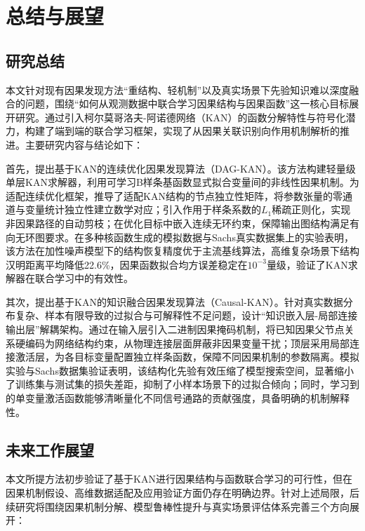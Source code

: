 \chapter{总结与展望}
\label{chap:conclusion}

\section{研究总结}
\label{sec:summary}

本文针对现有因果发现方法“重结构、轻机制”以及真实场景下先验知识难以深度融合的问题，围绕“如何从观测数据中联合学习因果结构与因果函数”这一核心目标展开研究。通过引入柯尔莫哥洛夫-阿诺德网络（KAN）的函数分解特性与符号化潜力，构建了端到端的联合学习框架，实现了从因果关联识别向作用机制解析的推进。主要研究内容与结论如下：

首先，提出基于KAN的连续优化因果发现算法（DAG-KAN）。该方法构建轻量级单层KAN求解器，利用可学习B样条基函数显式拟合变量间的非线性因果机制。为适配连续优化框架，推导了适配KAN结构的节点独立性矩阵，将参数张量的零通道与变量统计独立性建立数学对应；引入作用于样条系数的$L_1$稀疏正则化，实现非因果路径的自动剪枝；在优化目标中嵌入连续无环约束，保障输出图结构满足有向无环图要求。在多种核函数生成的模拟数据与Sachs真实数据集上的实验表明，该方法在加性噪声模型下的结构恢复精度优于主流基线算法，高维复杂场景下结构汉明距离平均降低22.6\%，因果函数拟合均方误差稳定在$10^{-3}$量级，验证了KAN求解器在联合学习中的有效性。

其次，提出基于KAN的知识融合因果发现算法（Causal-KAN）。针对真实数据分布复杂、样本有限导致的过拟合与可解释性不足问题，设计“知识嵌入层-局部连接输出层”解耦架构。通过在输入层引入二进制因果掩码机制，将已知因果父节点关系硬编码为网络结构约束，从物理连接层面屏蔽非因果变量干扰；顶层采用局部连接激活层，为各目标变量配置独立样条函数，保障不同因果机制的参数隔离。模拟实验与Sachs数据集验证表明，该结构化先验有效压缩了模型搜索空间，显著缩小了训练集与测试集的损失差距，抑制了小样本场景下的过拟合倾向；同时，学习到的单变量激活函数能够清晰量化不同信号通路的贡献强度，具备明确的机制解释性。


\section{未来工作展望}
\label{sec:future_work}

本文所提方法初步验证了基于KAN进行因果结构与函数联合学习的可行性，但在因果机制假设、高维数据适配及应用验证方面仍存在明确边界。针对上述局限，后续研究将围绕因果机制分解、模型鲁棒性提升与真实场景评估体系完善三个方向展开：

